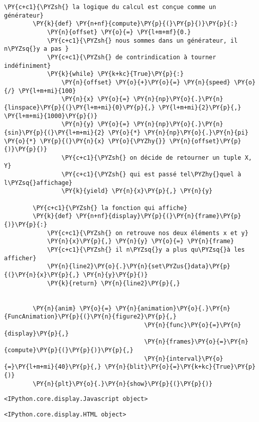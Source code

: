 \begin{Verbatim}[commandchars=\\\{\}]
        \PY{c+c1}{\PYZsh{} la logique du calcul est conçue comme un générateur}
        \PY{k}{def} \PY{n+nf}{compute}\PY{p}{(}\PY{p}{)}\PY{p}{:}
            \PY{n}{offset} \PY{o}{=} \PY{l+m+mf}{0.}
            \PY{c+c1}{\PYZsh{} nous sommes dans un générateur, il n\PYZsq{}y a pas }
            \PY{c+c1}{\PYZsh{} de contrindication à tourner indéfiniment}
            \PY{k}{while} \PY{k+kc}{True}\PY{p}{:}
                \PY{n}{offset} \PY{o}{+}\PY{o}{=} \PY{n}{speed} \PY{o}{/} \PY{l+m+mi}{100}
                \PY{n}{x} \PY{o}{=} \PY{n}{np}\PY{o}{.}\PY{n}{linspace}\PY{p}{(}\PY{l+m+mi}{0}\PY{p}{,} \PY{l+m+mi}{2}\PY{p}{,} \PY{l+m+mi}{1000}\PY{p}{)}
                \PY{n}{y} \PY{o}{=} \PY{n}{np}\PY{o}{.}\PY{n}{sin}\PY{p}{(}\PY{l+m+mi}{2} \PY{o}{*} \PY{n}{np}\PY{o}{.}\PY{n}{pi} \PY{o}{*} \PY{p}{(}\PY{n}{x} \PY{o}{\PYZhy{}} \PY{n}{offset}\PY{p}{)}\PY{p}{)}
                \PY{c+c1}{\PYZsh{} on décide de retourner un tuple X, Y}
                \PY{c+c1}{\PYZsh{} qui est passé tel\PYZhy{}quel à l\PYZsq{}affichage}
                \PY{k}{yield} \PY{n}{x}\PY{p}{,} \PY{n}{y} 
        
        \PY{c+c1}{\PYZsh{} la fonction qui affiche}
        \PY{k}{def} \PY{n+nf}{display}\PY{p}{(}\PY{n}{frame}\PY{p}{)}\PY{p}{:}
            \PY{c+c1}{\PYZsh{} on retrouve nos deux éléments x et y}
            \PY{n}{x}\PY{p}{,} \PY{n}{y} \PY{o}{=} \PY{n}{frame}
            \PY{c+c1}{\PYZsh{} il n\PYZsq{}y a plus qu\PYZsq{}à les afficher}
            \PY{n}{line2}\PY{o}{.}\PY{n}{set\PYZus{}data}\PY{p}{(}\PY{n}{x}\PY{p}{,} \PY{n}{y}\PY{p}{)}
            \PY{k}{return} \PY{n}{line2}\PY{p}{,}
        
        
        \PY{n}{anim} \PY{o}{=} \PY{n}{animation}\PY{o}{.}\PY{n}{FuncAnimation}\PY{p}{(}\PY{n}{figure2}\PY{p}{,}
                                       \PY{n}{func}\PY{o}{=}\PY{n}{display}\PY{p}{,}
                                       \PY{n}{frames}\PY{o}{=}\PY{n}{compute}\PY{p}{(}\PY{p}{)}\PY{p}{,}
                                       \PY{n}{interval}\PY{o}{=}\PY{l+m+mi}{40}\PY{p}{,} \PY{n}{blit}\PY{o}{=}\PY{k+kc}{True}\PY{p}{)}
        \PY{n}{plt}\PY{o}{.}\PY{n}{show}\PY{p}{(}\PY{p}{)}
\end{Verbatim}


    
    \begin{verbatim}
<IPython.core.display.Javascript object>
    \end{verbatim}

    
    
    \begin{verbatim}
<IPython.core.display.HTML object>
    \end{verbatim}

